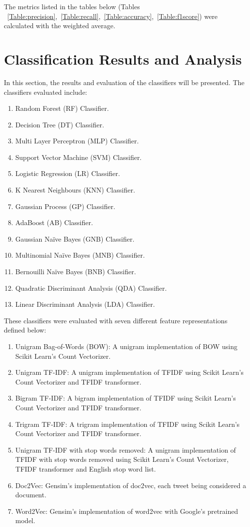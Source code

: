 The metrics listed in the tables below (Tables ~\ref{Table:precision},~\ref{Table:recall},~\ref{Table:accuracy},~\ref{Table:f1score}) were calculated with the weighted average.

\section{Classification Results and Analysis}

In this section, the results and evaluation of the classifiers will be presented. The classifiers evaluated include:
\begin{enumerate}
    \item Random Forest (RF) Classifier.
    \item Decision Tree (DT) Classifier.
    \item Multi Layer Perceptron (MLP) Classifier.
    \item Support Vector Machine (SVM) Classifier.
    \item Logistic Regression (LR) Classifier.
    \item K Nearest Neighbours (KNN) Classifier.
    \item Gaussian Process (GP) Classifier.
    \item AdaBoost (AB) Classifier.
    \item Gaussian Naïve Bayes (GNB) Classifier.
    \item Multinomial Naïve Bayes (MNB) Classifier.
    \item Bernouilli Naïve Bayes (BNB) Classifier.
    \item Quadratic Discriminant Analysis (QDA) Classifier.
    \item Linear Discriminant Analysis (LDA) Classifier.
\end{enumerate}

These classifiers were evaluated with seven different feature representations defined below:
\begin{enumerate}
    \item Unigram Bag-of-Words (BOW): A unigram implementation of BOW using Scikit Learn's Count Vectorizer.
    \item Unigram TF-IDF: A unigram implementation of TFIDF using Scikit Learn's Count Vectorizer and TFIDF transformer.
    \item Bigram TF-IDF: A bigram implementation of TFIDF using Scikit Learn's Count Vectorizer and TFIDF transformer.
    \item Trigram TF-IDF: A trigram implementation of TFIDF using Scikit Learn's Count Vectorizer and TFIDF transformer.
    \item Unigram TF-IDF with stop words removed: A unigram implementation of TFIDF with stop words removed using Scikit Learn's Count Vectorizer, TFIDF transformer and English stop word list.
    \item Doc2Vec: Gensim's implementation of doc2vec, each tweet being considered a document.
    \item Word2Vec: Gensim's implementation of word2vec with Google's pretrained model.
\end{enumerate}

